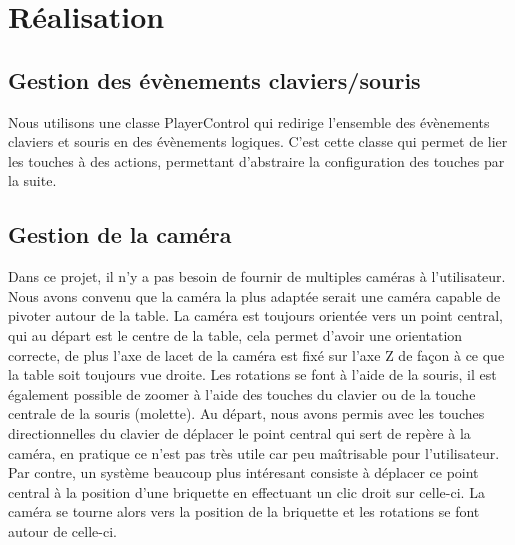 \documentclass[frenchb,twoside]{EPURapport}
\begin{document}
    
    

\chapter{Réalisation}
    \section{Gestion des évènements claviers/souris}
        Nous utilisons une classe PlayerControl qui redirige l'ensemble des
        évènements claviers et souris en des évènements logiques. C'est cette
        classe qui permet de lier les touches à des actions, permettant
        d'abstraire la configuration des touches par la suite.

    \section{Gestion de la caméra}
        Dans ce projet, il n'y a pas besoin de fournir de multiples caméras à
        l'utilisateur. Nous avons convenu que la caméra la plus adaptée serait
        une caméra capable de pivoter autour de la table. La caméra est
        toujours orientée vers un point central, qui au départ est le centre de
        la table, cela permet d'avoir une orientation correcte, de plus l'axe
        de lacet de la caméra est fixé sur l'axe Z de façon à ce que la table
        soit toujours vue droite. Les rotations se font à l'aide de la souris,
        il est également possible de zoomer à l'aide des touches du clavier
         ou de la touche centrale de la souris (molette).
        Au départ, nous avons permis avec les touches directionnelles du clavier de
        déplacer le point central qui sert de repère à la caméra, en pratique
        ce n'est pas très utile car peu maîtrisable pour l'utilisateur. Par
        contre, un système beaucoup plus intéresant consiste à déplacer ce point
        central à la position d'une briquette en effectuant un clic droit sur
        celle-ci. La caméra se tourne alors vers la position de la briquette et les rotations
        se font autour de celle-ci.
\end{document}
